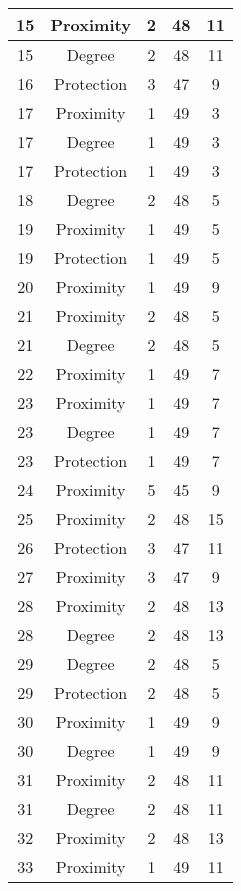 \documentclass[results.tex]{subfiles}
\begin{document}
\begin{center}
\begin{tabular}{| c || c | c | c | c |}
    \hline
    15 & Proximity & 2 & 48 & 11 \\ 
    \hline
    15 & Degree & 2 & 48 & 11 \\ 
    \hline
    16 & Protection & 3 & 47 & 9 \\ 
    \hline
    17 & Proximity & 1 & 49 & 3 \\ 
    \hline
    17 & Degree & 1 & 49 & 3 \\ 
    \hline
    17 & Protection & 1 & 49 & 3 \\ 
    \hline
    18 & Degree & 2 & 48 & 5 \\ 
    \hline
    19 & Proximity & 1 & 49 & 5 \\ 
    \hline
    19 & Protection & 1 & 49 & 5 \\ 
    \hline
    20 & Proximity & 1 & 49 & 9 \\ 
    \hline
    21 & Proximity & 2 & 48 & 5 \\ 
    \hline
    21 & Degree & 2 & 48 & 5 \\ 
    \hline
    22 & Proximity & 1 & 49 & 7 \\ 
    \hline
    23 & Proximity & 1 & 49 & 7 \\ 
    \hline
    23 & Degree & 1 & 49 & 7 \\ 
    \hline
    23 & Protection & 1 & 49 & 7 \\ 
    \hline
    24 & Proximity & 5 & 45 & 9 \\ 
    \hline
    25 & Proximity & 2 & 48 & 15 \\ 
    \hline
    26 & Protection & 3 & 47 & 11 \\ 
    \hline
    27 & Proximity & 3 & 47 & 9 \\ 
    \hline
    28 & Proximity & 2 & 48 & 13 \\ 
    \hline
    28 & Degree & 2 & 48 & 13 \\ 
    \hline
    29 & Degree & 2 & 48 & 5 \\ 
    \hline
    29 & Protection & 2 & 48 & 5 \\ 
    \hline
    30 & Proximity & 1 & 49 & 9 \\ 
    \hline
    30 & Degree & 1 & 49 & 9 \\ 
    \hline
    31 & Proximity & 2 & 48 & 11 \\ 
    \hline
    31 & Degree & 2 & 48 & 11 \\ 
    \hline
    32 & Proximity & 2 & 48 & 13 \\ 
    \hline
    33 & Proximity & 1 & 49 & 11 \\ 
    \hline

\end{tabular}
\end{center}
\end{document}
